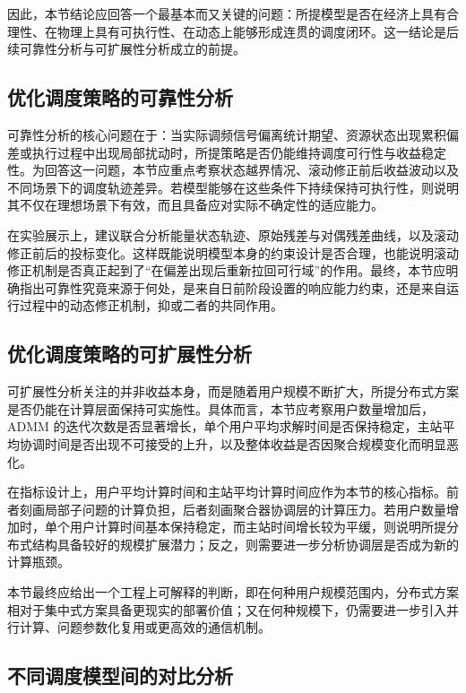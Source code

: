 因此，本节结论应回答一个最基本而又关键的问题：所提模型是否在经济上具有合理性、在物理上具有可执行性、在动态上能够形成连贯的调度闭环。这一结论是后续可靠性分析与可扩展性分析成立的前提。

\subsection{优化调度策略的可靠性分析}
\label{subsec:vpp_admm_case_reliability}

可靠性分析的核心问题在于：当实际调频信号偏离统计期望、资源状态出现累积偏差或执行过程中出现局部扰动时，所提策略是否仍能维持调度可行性与收益稳定性。为回答这一问题，本节应重点考察状态越界情况、滚动修正前后收益波动以及不同场景下的调度轨迹差异。若模型能够在这些条件下持续保持可执行性，则说明其不仅在理想场景下有效，而且具备应对实际不确定性的适应能力。

在实验展示上，建议联合分析能量状态轨迹、原始残差与对偶残差曲线，以及滚动修正前后的投标变化。这样既能说明模型本身的约束设计是否合理，也能说明滚动修正机制是否真正起到了“在偏差出现后重新拉回可行域”的作用。最终，本节应明确指出可靠性究竟来源于何处，是来自日前阶段设置的响应能力约束，还是来自运行过程中的动态修正机制，抑或二者的共同作用。

\subsection{优化调度策略的可扩展性分析}
\label{subsec:vpp_admm_case_scalability}

可扩展性分析关注的并非收益本身，而是随着用户规模不断扩大，所提分布式方案是否仍能在计算层面保持可实施性。具体而言，本节应考察用户数量增加后，ADMM 的迭代次数是否显著增长，单个用户平均求解时间是否保持稳定，主站平均协调时间是否出现不可接受的上升，以及整体收益是否因聚合规模变化而明显恶化。

在指标设计上，用户平均计算时间和主站平均计算时间应作为本节的核心指标。前者刻画局部子问题的计算负担，后者刻画聚合器协调层的计算压力。若用户数量增加时，单个用户计算时间基本保持稳定，而主站时间增长较为平缓，则说明所提分布式结构具备较好的规模扩展潜力；反之，则需要进一步分析协调层是否成为新的计算瓶颈。

本节最终应给出一个工程上可解释的判断，即在何种用户规模范围内，分布式方案相对于集中式方案具备更现实的部署价值；又在何种规模下，仍需要进一步引入并行计算、问题参数化复用或更高效的通信机制。

\subsection{不同调度模型间的对比分析}
\label{subsec:vpp_admm_case_comparison}

